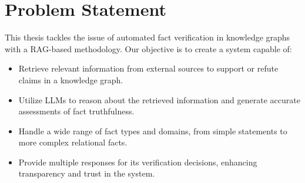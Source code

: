 \section{Problem Statement}\label{sec:problem}
This thesis tackles the issue of automated fact verification in knowledge graphs with a RAG-based methodology.
Our objective is to create a system capable of:
\begin{itemize}
    \item Retrieve relevant information from external sources to support or refute claims in a knowledge graph.
    \item Utilize \ac{LLMs} to reason about the retrieved information and generate accurate assessments of fact truthfulness.
    \item Handle a wide range of fact types and domains, from simple statements to more complex relational facts.
    \item Provide multiple responses for its verification decisions, enhancing transparency and trust in the system.
\end{itemize}

